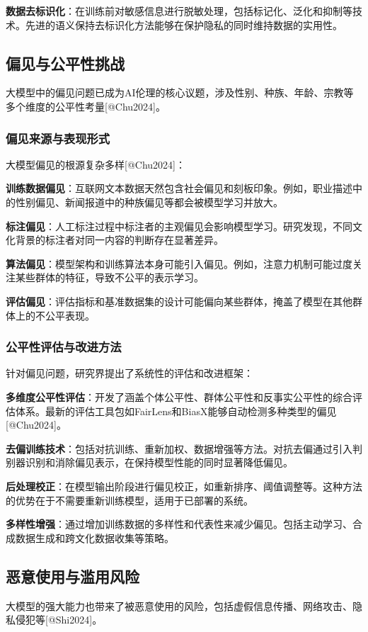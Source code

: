 \documentclass{article}
\begin{document}
\textbf{数据去标识化}：在训练前对敏感信息进行脱敏处理，包括标记化、泛化和抑制等技术。先进的语义保持去标识化方法能够在保护隐私的同时维持数据的实用性。

\subsection{偏见与公平性挑战}
大模型中的偏见问题已成为AI伦理的核心议题，涉及性别、种族、年龄、宗教等多个维度的公平性考量[@Chu2024]。

\subsubsection{偏见来源与表现形式}
大模型偏见的根源复杂多样[@Chu2024]：

\textbf{训练数据偏见}：互联网文本数据天然包含社会偏见和刻板印象。例如，职业描述中的性别偏见、新闻报道中的种族偏见等都会被模型学习并放大。

\textbf{标注偏见}：人工标注过程中标注者的主观偏见会影响模型学习。研究发现，不同文化背景的标注者对同一内容的判断存在显著差异。

\textbf{算法偏见}：模型架构和训练算法本身可能引入偏见。例如，注意力机制可能过度关注某些群体的特征，导致不公平的表示学习。

\textbf{评估偏见}：评估指标和基准数据集的设计可能偏向某些群体，掩盖了模型在其他群体上的不公平表现。

\subsubsection{公平性评估与改进方法}
针对偏见问题，研究界提出了系统性的评估和改进框架：

\textbf{多维度公平性评估}：开发了涵盖个体公平性、群体公平性和反事实公平性的综合评估体系。最新的评估工具包如FairLens和BiasX能够自动检测多种类型的偏见[@Chu2024]。

\textbf{去偏训练技术}：包括对抗训练、重新加权、数据增强等方法。对抗去偏通过引入判别器识别和消除偏见表示，在保持模型性能的同时显著降低偏见。

\textbf{后处理校正}：在模型输出阶段进行偏见校正，如重新排序、阈值调整等。这种方法的优势在于不需要重新训练模型，适用于已部署的系统。

\textbf{多样性增强}：通过增加训练数据的多样性和代表性来减少偏见。包括主动学习、合成数据生成和跨文化数据收集等策略。

\subsection{恶意使用与滥用风险}
大模型的强大能力也带来了被恶意使用的风险，包括虚假信息传播、网络攻击、隐私侵犯等[@Shi2024]。
\end{document}
